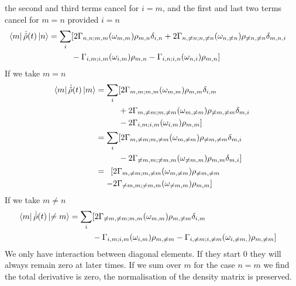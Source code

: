 the second and third terms cancel
for \(i=m\), and the first and
last two terms cancel for \(m=n\)
provided \(i = n\)
\begin{align}
  \bra{m}\dot{\hat{\rho}}(t) \ket{n} & = \begin{aligned}[t]
    \sum_{i} &
    [2 \Gamma_{n,n;m, m}(\omega_{m,m})\rho_{m, n}\delta_{i,n}
    + 2\Gamma_{n,\neq n;n, \neq n}(\omega_{n,\neq n})\rho_{\neq n, \neq n}\delta_{m,n, i} \\
             &
        - \Gamma_{i,m;i, m}(\omega_{i,m})\rho_{m, n}
        - \Gamma_{ i,n;i,n}(\omega_{n,i})\rho_{m, n}]
  \end{aligned}
\end{align}
If we take \(m=n\)
\begin{align}
  \bra{m}\dot{\hat{\rho}}(t) \ket{m} & = \begin{aligned}[t]
    \sum_{i} &
    [2 \Gamma_{m,m;m, m}(\omega_{m,m})\rho_{m, m}\delta_{i,m}                          \\ &
    + 2\Gamma_{m,\neq m;m, \neq m}(\omega_{m,\neq m})\rho_{\neq m, \neq m}\delta_{m,i} \\
             &
        - 2 \Gamma_{i,m;i, m}(\omega_{i,m})\rho_{m, m}]
  \end{aligned}                                                 \\
                                     & = \begin{aligned}[t]
    \sum_{i} &
    [2\Gamma_{m,\neq m;m, \neq m}(\omega_{m,\neq m})\rho_{\neq m, \neq m}\delta_{m,i} \\
             &
        -2 \Gamma_{\neq m,m;\neq m, m}(\omega_{\neq m,m})\rho_{m, m}\delta_{m,i}]
  \end{aligned}                                                 \\
                                     & = \begin{aligned}[t]
    [ & 2\Gamma_{m,\neq m;m, \neq m}(\omega_{m,\neq m})\rho_{\neq m, \neq m} \\
    - & 2\Gamma_{\neq m,m;\neq m, m}(\omega_{\neq m,m})\rho_{m, m}]
  \end{aligned}\label{eqn:cross terms density matrix evolution}
\end{align}
If we take \(m \neq n\)
\begin{align}
  \bra{m}\dot{\hat{\rho}}(t) \ket{\neq m} & = \begin{aligned}[t]
    \sum_{i} &
    [2 \Gamma_{\neq m,\neq m;m, m}(\omega_{m,m})\rho_{m, \neq m}\delta_{i,m} \\
             &
        - \Gamma_{i,m;i, m}(\omega_{i,m})\rho_{m, \neq m}
        - \Gamma_{ i,\neq m; i, \neq m}(\omega_{i, \neq m,})\rho_{m, \neq m}]
  \end{aligned}
\end{align}
We only have interaction
between diagonal elements.
If they start 0 they will
always remain zero at
later times. If we
sum over \(m\) for the
case \(n=m\) we find
the total derivative is
zero, the normalisation of
the density matrix is preserved.


